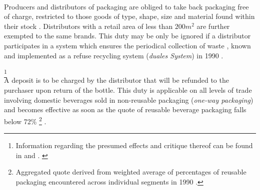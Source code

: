 \begin{description}[format={\storedescriptionlabel}]
	\item[Obligation to take back packaging]
	\hfill \\
	Producers and distributors of packaging are obliged to take back packaging free of charge, restricted to those goods of type, shape, size and material found within their stock \cite[§§~4-6]{verpackV1991}. Distributors with a retail area of less than $200m^2$ are further exempted to the same brands. This duty may be only be ignored if a distributor participates in a system which ensures the periodical collection of waste \cite[§~6]{verpackV1991}, known and implemented as a refuse recycling system (\textit{duales System}) in 1990 \cite[p.~3]{Hartlep2011Recycling}.
	\item[Obligation to levy deposits on \gls{beverage packaging}\label{itm:levyDepositObligation}] \footnote{Information regarding the presumed effects and critique thereof can be found in \cite[p.~630]{Cora2000} and \cite{wacker2008pflichtpfand}. \label{ftn:presumedEffects}}
	\hfill \\
	A deposit is to be charged by the distributor that will be refunded to the purchaser upon return of the bottle. This duty is applicable on all levels of trade involving domestic beverages sold in non-\gls{reusable packaging} (\textit{one-way packaging}) \cite[§~7]{verpackV1991} and becomes effective as soon as the quote of reusable beverage packaging falls below 72\% \footnote{Aggregated quote derived from weighted average of percentages of reusable packaging encountered across individual segments in 1990 \cite[§~9]{verpackV1991} \cite[p.~134]{Rummler/Schutt1991}.} \cite[§~9]{verpackV1991}.
\end{description}

